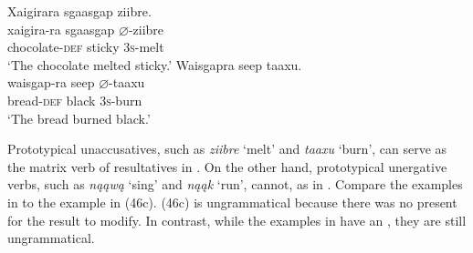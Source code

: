 \documentclass[output=paper]{LSP/langsci}
\begin{document}
\begin{exe}
\ex\label{ex:jrs:48}
\begin{xlist}
\ex     
\glll Xaigirara			sgaasgap		ziibre.\\
xaigira-ra			sgaasgap		$\varnothing$-ziibre \\
	chocolate-\textsc{def}	sticky			\textsc{3s}-melt \\
\trans `The chocolate melted sticky.'
\ex  
\glll Waisgapra		seep		taaxu.\\
waisgap-ra		seep		$\varnothing$-taaxu \\
	bread-\textsc{def}		black		\textsc{3s}-burn \\
\trans `The bread burned black.'
\end{xlist}
\end{exe}
\begin{exe}
\ex\label{ex:jrs:49}
\begin{xlist}
\end{xlist}
\end{exe}

Prototypical unaccusatives, such as \textit{ziibre} `melt' and \textit{taaxu} `burn', can serve as the matrix verb of resultatives in . On the other hand, prototypical unergative verbs, such as \textit{nąąwą} `sing' and \textit{nąąk} `run', cannot, as in . Compare the  examples in  to the  example in (46c). (46c) is ungrammatical because there was no  present for the result  to modify. In contrast, while the  examples in  have an , they are still ungrammatical.
	
\end{document}
